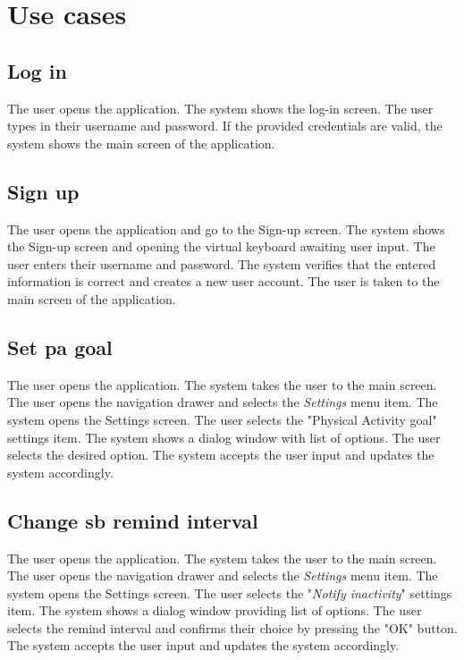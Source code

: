 \chapter{Use cases}

\section*{Log in}
    The user opens the application. The system shows the log-in screen. The user types in their username and password. If the provided credentials are valid, the system shows the main screen of the application.
    
\section*{Sign up}
    The user opens the application and go to the Sign-up screen. The system shows the Sign-up screen and opening the virtual keyboard awaiting user input. The user enters their username and password. The system verifies that the entered information is correct and creates a new user account. The user is taken to the main screen of the application.
    
\section*{Set \gls{pa} goal}
    The user opens the application. The system takes the user to the main screen. The user opens the navigation drawer and selects the \textit{Settings} menu item. The system opens the Settings screen. The user selects the "Physical Activity goal" settings item. The system shows a dialog window with list of options. The user selects the desired option. The system accepts the user input and updates the system accordingly.

\section*{Change \gls{sb} remind interval}
    The user opens the application. The system takes the user to the main screen. The user opens the navigation drawer and selects the \textit{Settings} menu item. The system opens the Settings screen. The user selects the "\textit{Notify inactivity}" settings item. The system shows a dialog window providing list of options. The user selects the remind interval and confirms their choice by pressing the "OK" button. The system accepts the user input and updates the system accordingly. 
    

